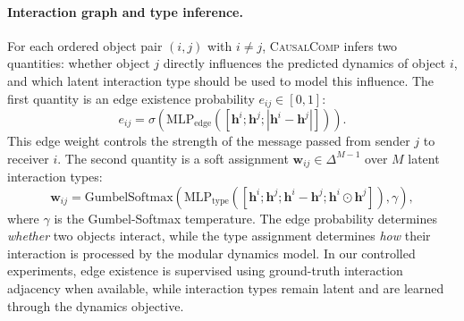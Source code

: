 \documentclass{article}
\newcommand{\ours}{\textsc{CausalComp}}
\begin{document}
\paragraph{Interaction graph and type inference.}
For each ordered object pair $(i,j)$ with $i \neq j$, \ours{} infers two quantities: whether object $j$ directly influences the predicted dynamics of object $i$, and which latent interaction type should be used to model this influence. The first quantity is an edge existence probability $e_{ij} \in [0,1]$:
\begin{equation}
    e_{ij} = \sigma\left(\text{MLP}_\text{edge}\left([\mathbf{h}^i; \mathbf{h}^j; |\mathbf{h}^i - \mathbf{h}^j|]\right)\right).
\end{equation}
This edge weight controls the strength of the message passed from sender $j$ to receiver $i$. The second quantity is a soft assignment $\mathbf{w}_{ij} \in \Delta^{M-1}$ over $M$ latent interaction types:
\begin{equation}
    \mathbf{w}_{ij} = \text{GumbelSoftmax}\left(
    \text{MLP}_\text{type}\left([\mathbf{h}^i; \mathbf{h}^j; \mathbf{h}^i - \mathbf{h}^j; \mathbf{h}^i \odot \mathbf{h}^j]\right), \gamma
    \right),
\end{equation}
where $\gamma$ is the Gumbel-Softmax temperature. The edge probability determines \emph{whether} two objects interact, while the type assignment determines \emph{how} their interaction is processed by the modular dynamics model. In our controlled experiments, edge existence is supervised using ground-truth interaction adjacency when available, while interaction types remain latent and are learned through the dynamics objective.


\end{document}
